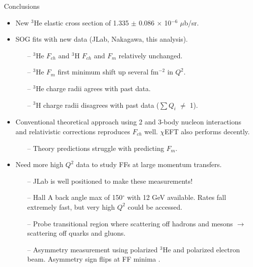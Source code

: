 \documentclass[10pt]{beamer}
\begin{document}
\begin{frame}[fragile]{Conclusions}
	\begin{itemize}
		\item New $^3$He elastic cross section of \alert{1.335 $\pm$ 0.086 $\times$ 10$^{-6}$ $\mu$b/sr}.
		\pause
		\item SOG fits with new data (JLab, Nakagawa, this analysis).
			\begin{itemize}
				\item[--] $^3$He $F_{ch}$ and $^3$H $F_{ch}$ and $F_m$ relatively unchanged.
				\item[--] \alert{$^3$He $F_{m}$ first minimum shift up several fm$^{-2}$ in $Q^2$}.
				\item[--] \alert{$^3$He charge radii agrees with past data}.
				\item[--] \alert{$^3$H charge radii disagrees with past data} ($\sum Q_i$ $\neq$ 1).
			\end{itemize}
		\pause
		\item \alert{Conventional theoretical approach} using 2 and 3-body nucleon interactions and relativistic corrections \alert{reproduces $F_{ch}$ well}. $\chi$EFT also performs decently.
			\begin{itemize}
				\item[--] \alert{Theory predictions struggle with predicting $F_m$}. 
			\end{itemize}
		\pause
		\item Need more high $Q^2$ data to study FFs at large momentum transfers.
			\begin{itemize}
				\item[--] \alert{JLab is well positioned to make these measurements}! 
				\item[--] Hall A back angle max of 150$^{\circ}$ with 12 GeV available. Rates fall extremely fast, but very high $Q^2$ could be accessed.
				\item[--] Probe transitional region where scattering off hadrons and mesons $\rightarrow$ scattering off quarks and gluons.
				\item[--] \alert{Asymmetry measurement} using polarized $^3$He and polarized electron beam. Asymmetry sign flips at FF minima \cite{Asymmetry}.
			\end{itemize}
		\end{itemize}
\end{frame}
\end{document}
